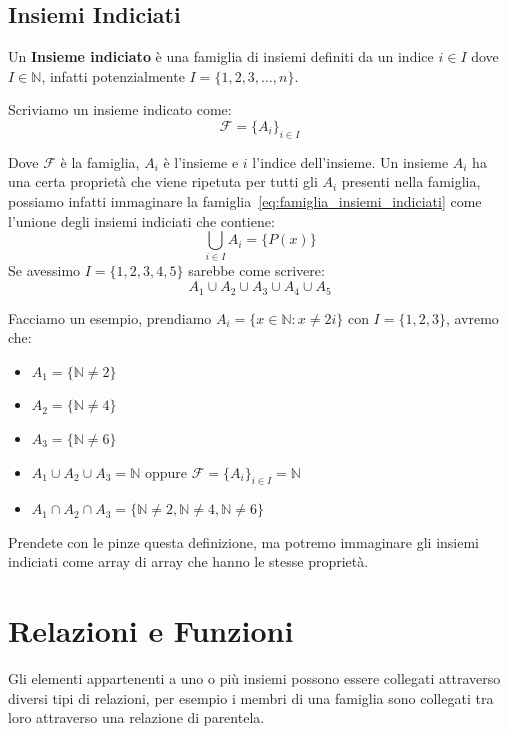 \documentclass{article}
\begin{document}
\subsection{Insiemi Indiciati}\label{sec:insiemi_indiciati}
Un \textbf{Insieme indiciato} è una famiglia di insiemi definiti da un indice $i \in I$ dove $I \in \mathbb{N}$, infatti potenzialmente $I = \{1,2,3,\ldots,n\}$. \par
Scriviamo un insieme indicato come:
\begin{equation}\label{eq:famiglia_insiemi_indiciati}
        \mathcal{F} = {\{A_i\}}_{i \in I}
\end{equation} 

Dove $\mathcal{F}$ è la famiglia, $A_i$ è l'insieme e $i$ l'indice dell'insieme. \newline
Un insieme $A_i$ ha una certa proprietà che viene ripetuta per tutti gli $A_i$ presenti nella famiglia, possiamo infatti immaginare la famiglia~\ref{eq:famiglia_insiemi_indiciati} come l'unione degli insiemi indiciati che contiene:
\begin{equation*}
        \bigcup_{i \in I}A_i = \{P(x)\}
\end{equation*}
Se avessimo $I = \{1,2,3,4,5\}$ sarebbe come scrivere:
\begin{equation*}
        A_1 \cup A_2 \cup A_3 \cup A_4 \cup A_5
\end{equation*}

Facciamo un esempio, prendiamo $A_i = \{x \in \mathbb{N} : x \not = 2i\}$ con $I = \{1,2,3\}$, avremo che:
\begin{itemize}
        \item $A_1 = \{\mathbb{N} \not = 2\}$
        \item $A_2 = \{\mathbb{N} \not = 4\}$
        \item $A_3 = \{\mathbb{N} \not = 6\}$
        \item $A_1 \cup A_2 \cup A_3 = \mathbb{N}$ oppure $\mathcal{F} = {\{A_i\}}_{i \in I} = \mathbb{N}$
        \item $A_1 \cap A_2 \cap A_3 = \{\mathbb{N} \not = 2, \mathbb{N} \not = 4, \mathbb{N} \not = 6\}$
\end{itemize}

Prendete con le pinze questa definizione, ma potremo immaginare gli insiemi indiciati come array di array che hanno le stesse proprietà.


\newpage
\section{Relazioni e Funzioni}
Gli elementi appartenenti a uno o più insiemi possono essere collegati attraverso diversi tipi di relazioni, per esempio i membri di una famiglia sono collegati tra loro attraverso una relazione di parentela. \par
\end{document}
